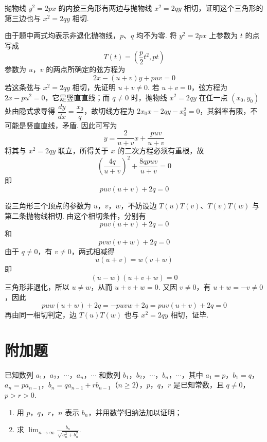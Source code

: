 \documentclass[UTF8,a4paper,oneside,11pt]{ctexbook}
\begin{document}
\begin{problem}

抛物线 \(y^2=2px\) 的内接三角形有两边与抛物线 \(x^2=2qy\) 相切，证明这个三角形的第三边也与 \(x^2=2qy\) 相切.
\end{problem}

\begin{solution}
由于题中两式均表示非退化抛物线，\(p\)、\(q\) 均不为零. 将 \(y^2=2px\) 上参数为 \(t\) 的点写成
\[
T(t)=\left(\dfrac{p}{2}t^2,pt\right)
\]
参数为 \(u\)，\(v\) 的两点所确定的弦方程为
\[
2x-(u+v)y+puv=0
\]
若这条弦与 \(x^2=2qy\) 相切，先证明 \(u+v\neq0\). 若 \(u+v=0\)，弦方程为 \(2x-pu^2=0\)，它是竖直直线；而 \(q\neq0\) 时，抛物线 \(x^2=2qy\) 在任一点 \(\left(x_0,y_0\right)\) 处由隐式求导得 \(\dfrac{dy}{dx}=\dfrac{x_0}{q}\)，故切线方程为 \(2x_0x-2qy-x_0^2=0\)，其斜率有限，不可能是竖直直线，矛盾. 因此可写为
\[
y=\dfrac{2}{u+v}x+\dfrac{puv}{u+v}
\]
将其与 \(x^2=2qy\) 联立，所得关于 \(x\) 的二次方程必须有重根，故
\[
\left(\dfrac{4q}{u+v}\right)^2+\dfrac{8qpuv}{u+v}=0
\]
即
\[
puv(u+v)+2q=0
\]

设三角形三个顶点的参数为 \(u\)，\(v\)，\(w\)，不妨设边 \(T(u)T(v)\)、\(T(v)T(w)\) 与第二条抛物线相切. 由这个相切条件，分别有
\[
puv(u+v)+2q=0
\]
和
\[
pvw(v+w)+2q=0
\]
由于 \(q\neq0\)，有 \(v\neq0\)，两式相减得
\[
u(u+v)=w(v+w)
\]
即
\[
(u-w)(u+v+w)=0
\]
三角形非退化，所以 \(u\neq w\)，从而 \(u+v+w=0\). 又因 \(v\neq0\)，有 \(u+w=-v\neq0\)，因此
\[
puw(u+w)+2q=-puvw+2q=puv(u+v)+2q=0
\]
再由同一相切判定，边 \(T(u)T(w)\) 也与 \(x^2=2qy\) 相切，证毕.
\end{solution}

\section{附加题}

\begin{problem}

已知数列 \(a_1\)，\(a_2\)，\(\cdots\)，\(a_n\)，\(\cdots\) 和数列 \(b_1\)，\(b_2\)，\(\cdots\)，\(b_n\)，\(\cdots\)，其中 \(a_1=p\)，\(b_1=q\)，\(a_n=pa_{n-1}\)，\(b_n=qa_{n-1}+rb_{n-1}\)（\(n\geqslant 2\)），\(p\)，\(q\)，\(r\) 是已知常数，且 \(q\neq 0\)，\(p>r>0\).

\begin{enumerate}
\item 用 \(p\)，\(q\)，\(r\)，\(n\) 表示 \(b_n\)，并用数学归纳法加以证明；
\item 求 \(\displaystyle\lim_{n\to\infty}\frac{b_n}{\sqrt{a_n^2+b_n^2}}\).
\end{enumerate}
\end{problem}
\end{document}
